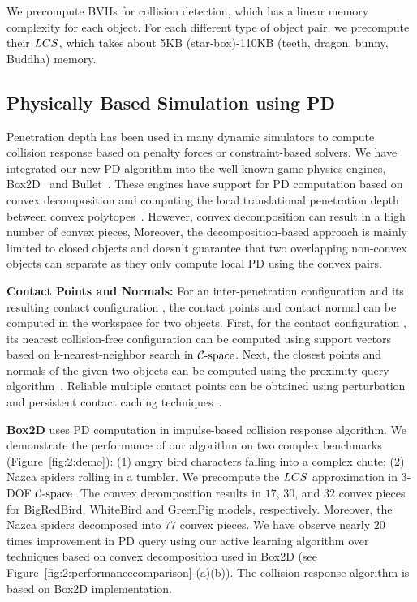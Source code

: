 We precompute BVHs for collision detection, which has a linear memory complexity for each object. For each different type of object pair, we precompute their $LCS$, which takes about 5KB (star-box)-110KB (teeth, dragon, bunny, Buddha) memory.





\subsection{Physically Based Simulation using PD}
Penetration depth has been used in many dynamic simulators to compute collision response based on penalty forces or constraint-based solvers.
We have integrated our new PD algorithm into the well-known game physics
engines, Box2D~\cite{Erin:2012:Box2D} and Bullet~\cite{Erwin:2012:Bullet}. These engines have support for PD computation based on
convex decomposition and computing the local translational penetration depth between convex polytopes~\cite{Gino:2001:GDC}.
However, convex decomposition can result in a high number of convex pieces, Moreover, the decomposition-based approach is mainly limited to closed
objects and  doesn't guarantee that two
overlapping non-convex objects can separate as they only compute local PD using the convex pairs.

\textbf{Contact Points and Normals:} For an inter-penetration configuration \qa and its resulting contact configuration \qc, the contact points and contact normal can be computed in the workspace for two objects. First, for the contact configuration \qc, its nearest collision-free configuration can be computed using support vectors based on k-nearest-neighbor search in $\mathcal C\text{-space}$. Next, the closest points and normals of the given two objects can be computed using the proximity query algorithm~\cite{LGLM00}. Reliable multiple contact points can be obtained using perturbation and persistent contact caching techniques~\cite{Erwin:2012:Bullet}.

\textbf{Box2D} uses PD computation in  impulse-based collision response algorithm.
We demonstrate the performance of our algorithm on
two complex benchmarks (Figure~\ref{fig:2:demo}): (1) angry bird characters falling into a complex chute; (2) Nazca spiders rolling in a tumbler. We precompute the $LCS$ approximation in 3-DOF $\mathcal C\text{-space}$.
The convex decomposition results in $17$, $30$, and $32$ convex pieces for BigRedBird, WhiteBird and GreenPig models, respectively. Moreover, the Nazca spiders decomposed into $77$ convex pieces. We have observe nearly $20$ times improvement in PD query using our active learning algorithm over
techniques based on convex decomposition used in Box2D (see Figure~\ref{fig:2:performancecomparison}-(a)(b)). The collision response algorithm is based on Box2D implementation.


